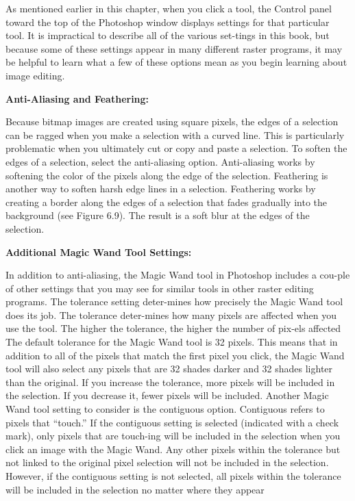 \documentclass{report}
\begin{document}
    \bigbreak \noindent 
    As mentioned earlier in this chapter, when you click a tool, the Control panel toward the top of the Photoshop window displays settings for that particular tool. It is impractical to describe all of the various set-tings in this book, but because some of these settings appear in many different raster programs, it may be helpful to learn what a few of these options mean as you begin learning about image editing.

    \bigbreak \noindent \bigbreak \noindent 
    \begin{large}
      \textbf{Anti-Aliasing and Feathering:}
    \end{large}
    \bigbreak \noindent 
    Because bitmap images are created using square pixels, the edges of a selection can be ragged when you make a selection with a curved line. This is particularly problematic when you ultimately cut or copy and paste a selection. To soften the edges of a selection, select the anti-aliasing option. Anti-aliasing works by softening the color of the pixels along the edge of the selection.
    \bigbreak \noindent 
    Feathering is another way to soften harsh edge lines in a selection. Feathering works by creating a border along the edges of a selection that fades gradually into the background (see Figure 6.9). The result is a soft blur at the edges of the selection.
    \bigbreak \noindent 

    \bigbreak \noindent \bigbreak \noindent 
    \begin{large}
      \textbf{Additional Magic Wand Tool Settings:}
    \end{large}
    \bigbreak \noindent 
    In addition to anti-aliasing, the Magic Wand tool in Photoshop includes a cou-ple of other settings that you may see for similar tools in other raster editing programs. The tolerance setting deter-mines how precisely the Magic Wand tool does its job. The tolerance deter-mines how many pixels are affected when you use the tool. The higher the tolerance, the higher the number of pix-els affected
    \bigbreak \noindent 
    The default tolerance for the Magic Wand tool is 32 pixels. This means that in addition to all of the pixels that match the first pixel you click, the Magic Wand tool will also select any pixels that are 32 shades darker and 32 shades lighter than the original. If you increase the tolerance, more pixels will be included in the selection. If you decrease it, fewer pixels will be included.
    \bigbreak \noindent 
    Another Magic Wand tool setting to consider is the contiguous option. Contiguous refers to pixels that “touch.” If the contiguous setting is selected (indicated with a check mark), only pixels that are touch-ing will be included in the selection when you click an image with the Magic Wand. Any other pixels within the tolerance but not linked to the original pixel selection will not be included in the selection. However, if the contiguous setting is not selected, all pixels within the tolerance will be included in the selection no matter where they appear
\end{document}
